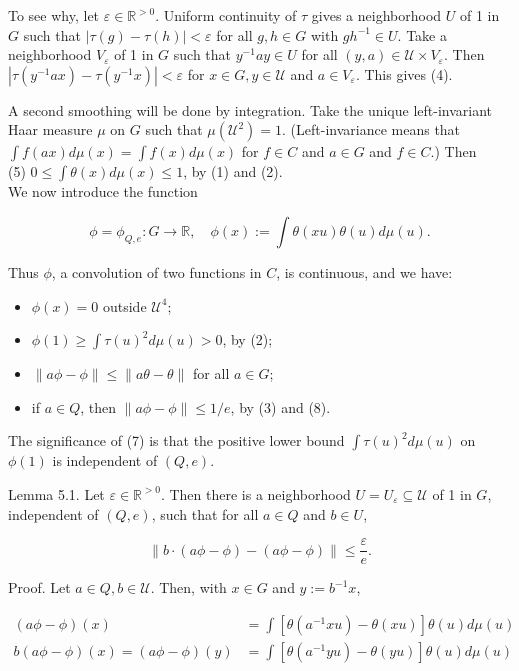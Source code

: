 \documentclass[10pt]{article}
\begin{document}
To see why, let $\varepsilon \in \mathbb{R}^{>0}$. Uniform continuity of $\tau$ gives a neighborhood $U$ of 1 in $G$ such that $|\tau(g)-\tau(h)|<\varepsilon$ for all $g, h \in G$ with $g h^{-1} \in U$. Take a neighborhood $V_{\varepsilon}$ of 1 in $G$ such that $y^{-1} a y \in U$ for all $(y, a) \in \mathcal{U} \times V_{\varepsilon}$. Then $\left|\tau\left(y^{-1} a x\right)-\tau\left(y^{-1} x\right)\right|<\varepsilon$ for $x \in G, y \in \mathcal{U}$ and $a \in V_{\varepsilon}$. This gives (4).

A second smoothing will be done by integration. Take the unique left-invariant Haar measure $\mu$ on $G$ such that $\mu\left(\mathcal{U}^{2}\right)=1$. (Left-invariance means that $\int f(a x) d \mu(x)=\int f(x) d \mu(x)$ for $f \in C$ and $a \in G$ and $f \in C$.) Then\\
(5) $0 \leq \int \theta(x) d \mu(x) \leq 1$, by (1) and (2).\\
We now introduce the function

$$
\phi=\phi_{Q, e}: G \rightarrow \mathbb{R}, \quad \phi(x):=\int \theta(x u) \theta(u) d \mu(u) .
$$

Thus $\phi$, a convolution of two functions in $C$, is continuous, and we have:

\begin{itemize}
  \item[(6)] $\phi(x)=0$ outside $\mathcal{U}^{4}$;
  \item[(7)] $\phi(1) \geq \int \tau(u)^{2} d \mu(u)>0$, by (2);
  \item[(8)] $\|a \phi-\phi\| \leq\|a \theta-\theta\|$ for all $a \in G$;
  \item[(9)] if $a \in Q$, then $\|a \phi-\phi\| \leq 1 / e$, by (3) and (8).
\end{itemize}

The significance of (7) is that the positive lower bound $\int \tau(u)^{2} d \mu(u)$ on $\phi(1)$ is independent of $(Q, e)$.

Lemma 5.1. Let $\varepsilon \in \mathbb{R}^{>0}$. Then there is a neighborhood $U=U_{\varepsilon} \subseteq \mathcal{U}$ of 1 in $G$, independent of $(Q, e)$, such that for all $a \in Q$ and $b \in U$,

$$
\|b \cdot(a \phi-\phi)-(a \phi-\phi)\| \leq \frac{\varepsilon}{e} .
$$

Proof. Let $a \in Q, b \in \mathcal{U}$. Then, with $x \in G$ and $y:=b^{-1} x$,

$$
\begin{aligned}
(a \phi-\phi)(x) & =\int\left[\theta\left(a^{-1} x u\right)-\theta(x u)\right] \theta(u) d \mu(u) \\
b(a \phi-\phi)(x)=(a \phi-\phi)(y) & =\int\left[\theta\left(a^{-1} y u\right)-\theta(y u)\right] \theta(u) d \mu(u)
\end{aligned}
$$
\end{document}
